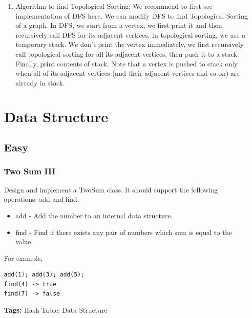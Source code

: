 \documentclass[12pt]{book}
\begin{document}
\begin{enumerate}
\item Algorithm to find Topological Sorting:
\label{sec-18-2-3-3}
We recommend to first see implementation of DFS here. We can modify DFS to find Topological Sorting of a graph. In DFS, we start from a vertex, we first print it and then recursively call DFS for its adjacent vertices. In topological sorting, we use a temporary stack. We don’t print the vertex immediately, we first recursively call topological sorting for all its adjacent vertices, then push it to a stack. Finally, print contents of stack. Note that a vertex is pushed to stack only when all of its adjacent vertices (and their adjacent vertices and so on) are already in stack.
\end{enumerate}

\chapter{Data Structure}
\label{sec-19}
\section{Easy}
\label{sec-19-1}
\subsection{Two Sum III}
\label{sec-19-1-1}
Design and implement a TwoSum class. It should support the following operations: add and find.
\begin{itemize}
\item add - Add the number to an internal data structure.
\item find - Find if there exists any pair of numbers which sum is equal to the value.
\end{itemize}
For example,
\lstset{language=java,label= ,caption= ,numbers=none}
\begin{lstlisting}
add(1); add(3); add(5);
find(4) -> true
find(7) -> false
\end{lstlisting}
\textbf{Tags:} Hash Table, Data Structure
\end{document}
